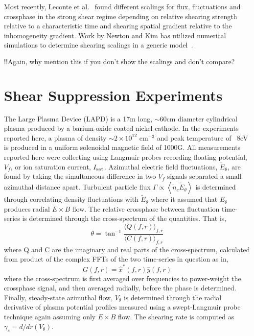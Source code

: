\documentclass[aip,pop,amsmath,amssymb,preprint,superscriptaddress]{revtex4-1} %
\begin{document}
Most recently, Leconte et al.~\cite{leconte06} found different scalings for flux, fluctuations and crossphase in the strong shear regime depending on relative shearing strength relative to a characteristic time and shearing spatial gradient relative to the inhomogeneity gradient. Work by Newton and Kim has utilized numerical simulations to determine shearing scalings in a generic model~\cite{newton07,newton11}.

!!Again, why mention this if you don't show the scalings and don't compare?

\section{Shear Suppression Experiments}

The Large Plasma Device \cite{gek91} (LAPD) is a 17m long, $\sim$60cm diameter cylindrical plasma produced by a barium-oxide coated nickel cathode. In the experiments reported here, a plasma of density $\sim$$2 \times 10^{12}$ cm$^{-3}$ and peak temperature of ~8eV is produced in a uniform solenoidal magnetic field of 1000G. All measurements reported here were collecting using Langmuir probes recording floating potential, $V_{f}$, or ion saturation current, $I_{\rm sat}$. Azimuthal electric field fluctuations, $\tilde{E}_{\theta}$, are found by taking the simultaneous difference in two $V_{f}$ signals separated a small azimuthal distance apart. Turbulent particle flux $\Gamma \propto \left<\tilde{n}_e \tilde{E}_\theta\right>$ is determined through correlating density fluctuations with $\tilde{E}_{\theta}$ where it assumed that $E_{\theta}$ produces radial $E \times B$ flow. The relative crossphase between fluctuation time-series is determined through the cross-spectrum of the quantities. That is,
%
\begin{equation}
\theta = \tan^{-1}\frac{\langle Q(f,r)\rangle_{f,r}}{\langle C(f,r)\rangle_{f,r}}
\label{eq:crossphase}
\end{equation}
%
where Q and C are the imaginary and real parts of the cross-spectrum, calculated from product of the complex FFTs of the two time-series in question as in,
\begin{equation}
G(f,r) = \hat{x}^{\ast}(f,r)\hat{y}(f,r)
\label{eq:crossspectrum}
\end{equation}
%
where the cross-spectrum is first averaged over frequencies to power-weight the crossphase signal, and then averaged radially, before the phase is determined. Finally, steady-state azimuthal flow, $V_{\theta}$ is determined through the radial derivative of plasma potential profiles measured using a swept-Langmuir probe technique again assuming only $E \times B$ flow. The shearing rate is computed as $\gamma_{s} = d/dr(V_{\theta})$.
\end{document}

